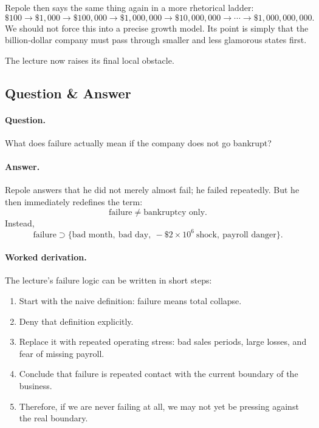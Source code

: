Repole then says the same thing again in a more rhetorical ladder:
\begin{equation}
\$100 \to \$1{,}000 \to \$100{,}000 \to \$1{,}000{,}000 \to \$10{,}000{,}000 \to \cdots \to \$1{,}000{,}000{,}000.
\end{equation}
We should not force this into a precise growth model. Its point is simply that the billion-dollar company must pass through smaller and less glamorous states first.

The lecture now raises its final local obstacle.

\subsection{Question \& Answer}

\paragraph{Question.}
What does failure actually mean if the company does not go bankrupt?

\paragraph{Answer.}
Repole answers that he did not merely almost fail; he failed repeatedly. But he then immediately redefines the term:
\begin{equation}
\text{failure} \neq \text{bankruptcy only}.
\end{equation}
Instead,
\begin{equation}
\text{failure} \supset \{\text{bad month},\ \text{bad day},\ -\$2\times 10^6\ \text{shock},\ \text{payroll danger}\}.
\end{equation}

\paragraph{Worked derivation.}
The lecture's failure logic can be written in short steps:
\begin{enumerate}
\item Start with the naive definition: failure means total collapse.
\item Deny that definition explicitly.
\item Replace it with repeated operating stress: bad sales periods, large losses, and fear of missing payroll.
\item Conclude that failure is repeated contact with the current boundary of the business.
\item Therefore, if we are never failing at all, we may not yet be pressing against the real boundary.
\end{enumerate}

